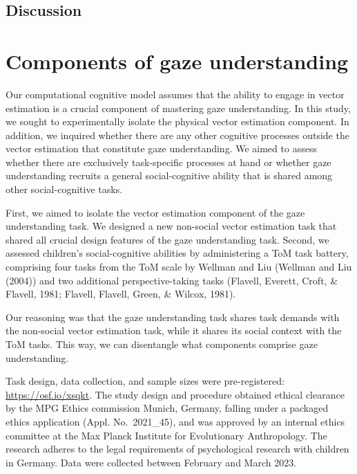 \documentclass[
  man,floatsintext]{apa6}
\begin{document}
\hypertarget{discussion-1}{%
\subsection{Discussion}\label{discussion-1}}

\hypertarget{components-of-gaze-understanding}{%
\section{Components of gaze understanding}\label{components-of-gaze-understanding}}

Our computational cognitive model assumes that the ability to engage in vector estimation is a crucial component of mastering gaze understanding.
In this study, we sought to experimentally isolate the physical vector estimation component.
In addition, we inquired whether there are any other cognitive processes outside the vector estimation that constitute gaze understanding.
We aimed to assess whether there are exclusively task-specific processes at hand or whether gaze understanding recruits a general social-cognitive ability that is shared among other social-cognitive tasks.

First, we aimed to isolate the vector estimation component of the gaze understanding task.
We designed a new non-social vector estimation task that shared all crucial design features of the gaze understanding task.
Second, we assessed children's social-cognitive abilities by administering a ToM task battery, comprising four tasks from the ToM scale by Wellman and Liu (Wellman and Liu (2004)) and two additional perspective-taking tasks (Flavell, Everett, Croft, \& Flavell, 1981; Flavell, Flavell, Green, \& Wilcox, 1981).

Our reasoning was that the gaze understanding task shares task demands with the non-social vector estimation task, while it shares its social context with the ToM tasks.
This way, we can disentangle what components comprise gaze understanding.

Task design, data collection, and sample sizes were pre-registered: \url{https://osf.io/xsqkt}.
The study design and procedure obtained ethical clearance by the MPG Ethics commission Munich, Germany, falling under a packaged ethics application (Appl. No.~2021\_45), and was approved by an internal ethics committee at the Max Planck Institute for Evolutionary Anthropology.
The research adheres to the legal requirements of psychological research with children in Germany.
Data were collected between February and March 2023.
\end{document}
